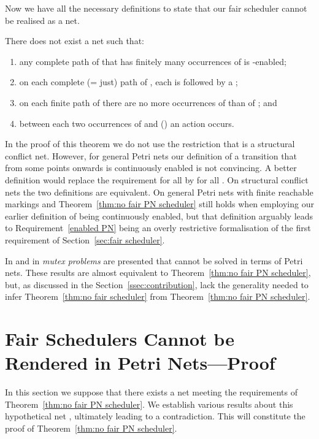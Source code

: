 \documentclass[smallcondensed]{svjour3}
\newcommand{\Thm}[1]{Theorem~\ref{thm:#1}}
\newcommand{\Sect}[1]{Section~\ref{sec:#1}}
\newcommand{\SSect}[1]{Section~\ref{ssec:#1}}
\begin{document}
Now we have all the necessary definitions to state that our fair scheduler cannot be realised as a net.

\begin{theorem}\rm\label{thm:no fair PN scheduler}
There does not exist a net  such that:
\vspace{-1ex}
\begin{enumerate}
\item any complete path of  that has finitely many occurrences of  is -enabled;\label{enabled PN}
\item on each complete (= just) path of , each  is followed by a ;\label{fair PN}
\item on each finite path of  there are no more occurrences of  than of ;\label{patient PN} and
\item between each two occurrences of  and  () an action  occurs.\label{coordinated PN}
\end{enumerate}
\end{theorem}
In the proof of this theorem we do not use the restriction that  is a structural conflict net.
However, for general Petri nets our definition of a transition that from some points onwards is
continuously enabled is not convincing. A better definition would replace the requirement 
 for all  by
 for all .
On structural conflict nets the two definitions are equivalent.
On general
Petri nets with finite reachable markings and  \Thm{no fair PN scheduler}
still holds when employing our earlier definition of being continuously enabled, but that definition
arguably leads to Requirement~\ref{enabled PN} being an overly restrictive formalisation of the first requirement
of \Sect{fair scheduler}.

In \cite{Vogler02} and in \cite{KW97} \emph{mutex problems} are presented that cannot be solved
in terms of Petri nets. These results are almost equivalent to \Thm{no fair PN scheduler}, but,
as discussed in the \SSect{contribution}, lack the generality needed to infer \Thm{no fair scheduler} from \Thm{no fair PN scheduler}.


\section{Fair Schedulers Cannot be Rendered in Petri Nets---Proof}
\label{sec:proof PN}


In this section we suppose that there exists a net 
meeting the requirements of \Thm{no fair PN scheduler}.
We establish various results about this hypothetical net , ultimately leading to a
contradiction. This will constitute the proof of \Thm{no fair PN scheduler}.
\end{document}
